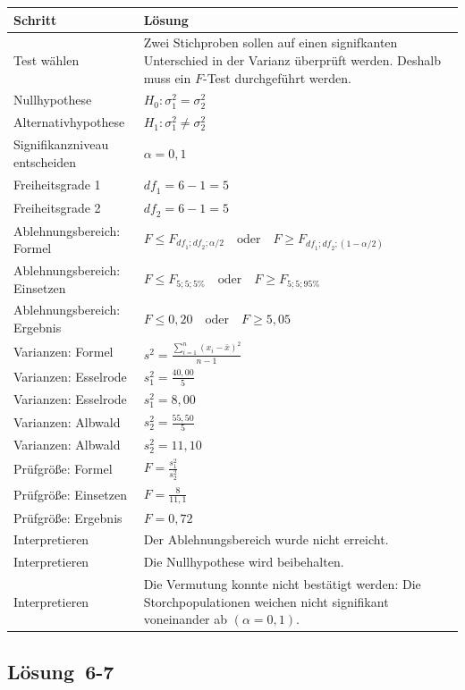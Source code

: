 \documentclass[
  11pt,
  ngerman,
  a4paper,
]{report}
\begin{document}
\begin{table}[H]
\centering
\begin{tabular}{ll}
\toprule
\textbf{Schritt} & \textbf{Lösung}\\
\midrule
Test wählen & Zwei Stichproben sollen auf einen signifkanten Unterschied in der Varianz überprüft werden. Deshalb muss ein $F$-Test durchgeführt werden.\\
Nullhypothese & $H_0: \sigma^2_1 = \sigma^2_2$\\
Alternativhypothese & $H_1: \sigma^2_1 \neq \sigma^2_2$\\
Signifikanzniveau entscheiden & $\alpha = 0{,}1$\\
Freiheitsgrade 1 & $\mathit{df}_1 = 6-1 = 5$\\
Freiheitsgrade 2 & $\mathit{df}_2 = 6-1 = 5$\\
Ablehnungsbereich: Formel & $F \leq F_{\mathit{df_1};\mathit{df_2};\alpha/2}\quad \textrm{oder} \quad F \geq F_{\mathit{df_1};\mathit{df_2};(1-\alpha/2)}$\\
Ablehnungsbereich: Einsetzen & $F \leq F_{5;5;{5\%}} \quad \textrm{oder} \quad F \geq F_{5;5;{95\%}}$\\
Ablehnungsbereich: Ergebnis & $F \leq 0{,}20\quad \textrm{oder} \quad F \geq 5{,}05$\\
Varianzen: Formel & $s^2=\frac{\sum\limits_{i=1}^{n}(x_{i}-\bar{x})^2}{n-1}$\\
Varianzen: Esselrode & $s^2_1=\frac{40{,}00}{5}$\\
Varianzen: Esselrode & $s^2_1=8{,}00$\\
Varianzen: Albwald & $s^2_2=\frac{55{,}50}{5}$\\
Varianzen: Albwald & $s^2_2=11{,}10$\\
Prüfgröße: Formel & $F = \frac{s^2_1}{s^2_2}$\\
Prüfgröße: Einsetzen & $F = \frac{8}{11{,}1}$\\
Prüfgröße: Ergebnis & $F = 0{,}72$\\
Interpretieren & Der Ablehnungsbereich wurde nicht erreicht.\\
Interpretieren & Die Nullhypothese wird beibehalten.\\
Interpretieren & Die Vermutung konnte nicht bestätigt werden: Die Storchpopulationen weichen nicht signifikant voneinander ab $(\alpha=0{,}1)$.\\
\bottomrule
\end{tabular}
\end{table}

\hypertarget{loesung-6-7}{%
\subsection{Lösung~6-7}\label{loesung-6-7}}
\end{document}

